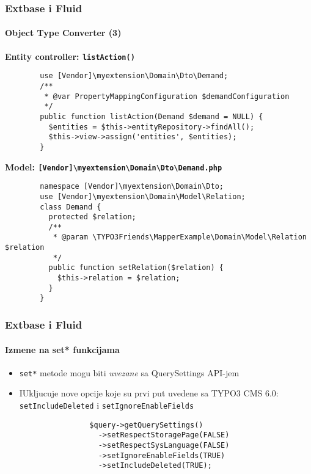 \begin{frame}[fragile]
	\frametitle{Extbase i Fluid}
	\framesubtitle{Object Type Converter (3)}

	\lstset{
		basicstyle=\tiny\ttfamily
	}

	\smaller\textbf{Entity controller: \texttt{listAction()}}\normalsize
	\begin{lstlisting}
		use [Vendor]\myextension\Domain\Dto\Demand;
		/**
		 * @var PropertyMappingConfiguration $demandConfiguration
		 */
		public function listAction(Demand $demand = NULL) {
		  $entities = $this->entityRepository->findAll();
		  $this->view->assign('entities', $entities);
		}
	\end{lstlisting}

	\smaller\textbf{Model: \texttt{[Vendor]\textbackslash myextension\textbackslash Domain\textbackslash Dto\textbackslash Demand.php}}\normalsize
	\begin{lstlisting}
		namespace [Vendor]\myextension\Domain\Dto;
		use [Vendor]\myextension\Domain\Model\Relation;
		class Demand {
		  protected $relation;
		  /**
		   * @param \TYPO3Friends\MapperExample\Domain\Model\Relation $relation
		   */
		  public function setRelation($relation) {
		    $this->relation = $relation;
		  }
		}
	\end{lstlisting}

\end{frame}


\begin{frame}[fragile]
	\frametitle{Extbase i Fluid}
	\framesubtitle{Izmene na set* funkcijama}

	\lstset{
		basicstyle=\tiny\ttfamily
	}

	\begin{itemize}
		\item \texttt{set*} metode mogu biti  \emph{uvezane} sa QuerySettings API-jem
		\item IUkljucuje nove opcije koje su prvi put uvedene sa TYPO3 CMS 6.0:\newline
			\texttt{setIncludeDeleted} i \texttt{setIgnoreEnableFields}

			\begin{lstlisting}
				$query->getQuerySettings()
				  ->setRespectStoragePage(FALSE)
				  ->setRespectSysLanguage(FALSE)
				  ->setIgnoreEnableFields(TRUE)
				  ->setIncludeDeleted(TRUE);
			\end{lstlisting}
	\end{itemize}

\end{frame}

